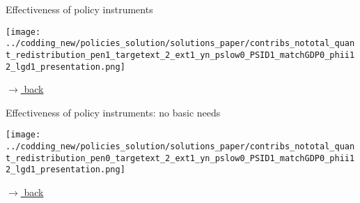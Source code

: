 \documentclass[11pt,aspectratio=169]{beamer}
\begin{document}
	\begin{frame}{Effectiveness of policy instruments}
		\hypertarget{backDecomp}{}
		\vspace{2mm}
		\centering
		\begin{minipage}[]{0.55\textwidth}
			\texttt{[image: ../codding\_new/policies\_solution/solutions\_paper/contribs\_nototal\_quant\_redistribution\_pen1\_targetext\_2\_ext1\_yn\_pslow0\_PSID1\_matchGDP0\_phii12\_lgd1\_presentation.png]}
		\end{minipage}
		
		\vspace{7mm}
		\hfill	
		\hyperlink{backpe}{\tiny{$\rightarrow$ back}}		 
		
	\end{frame}

	\begin{frame}{Effectiveness of policy instruments: no basic needs}
		\hypertarget{effDecomp}{}
		\vspace{2mm}
		\centering
		\begin{minipage}[]{0.55\textwidth}
			\texttt{[image: ../codding\_new/policies\_solution/solutions\_paper/contribs\_nototal\_quant\_redistribution\_pen0\_targetext\_2\_ext1\_yn\_pslow0\_PSID1\_matchGDP0\_phii12\_lgd1\_presentation.png]}
		\end{minipage}
		
		\vspace{7mm}
		\hfill	
		\hyperlink{backpe}{\tiny{$\rightarrow$ back}}		 
		
	\end{frame}
	
\end{document}
